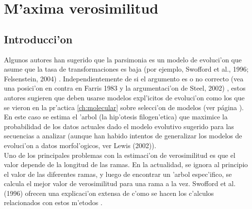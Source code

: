 \chapter{M'axima verosimilitud}
\section*{Introducci'on}
\label{ch:likelihood}
Algunos autores han sugerido que la parsimonia es un modelo de evoluci'on que asume que la tasa de transformaciones es baja (por ejemplo, Swofford et al., 1996; Felsenstein, 2004) \cite{Swofford1996} \cite{Felsenstein2004}. Independientemente de si el argumento es o no correcto (vea una posici'on en contra en Farris 1983  y la argumentaci'on de Steel, 2002)\cite{Farris1983} \cite{Steel2002}, estos autores sugieren que deben usarse modelos expl'icitos de evoluci'on como los que se vieron en la pr'actica \ref{ch:molecular} sobre selecci'on de modelos (ver p\'agina \pageref{ch:molecular}).\\
En este caso se estima el 'arbol (la hip'otesis filogen'etica) que 
maximice la probabilidad de los datos actuales dado el modelo evolutivo 
sugerido para las secuencias a analizar (aunque han habido intentos de 
generalizar los modelos de evoluci'on a datos morfol'ogicos, ver  
Lewis (2002)\cite{Lewis2001}).\\
Uno de los principales problemas con la estimaci'on de verosimilitud es que el valor depende de la longitud de las ramas. En la actualidad, se ignora al principio el valor de las diferentes ramas, y luego de encontrar un 'arbol espec'ifico, se calcula el mejor valor de verosimilitud para una rama a la vez. Swofford et al. (1996) ofrecen una explicaci'on extensa de c'omo se hacen los c'alculos relacionados con estos m'etodos \cite{Swofford1996}.
